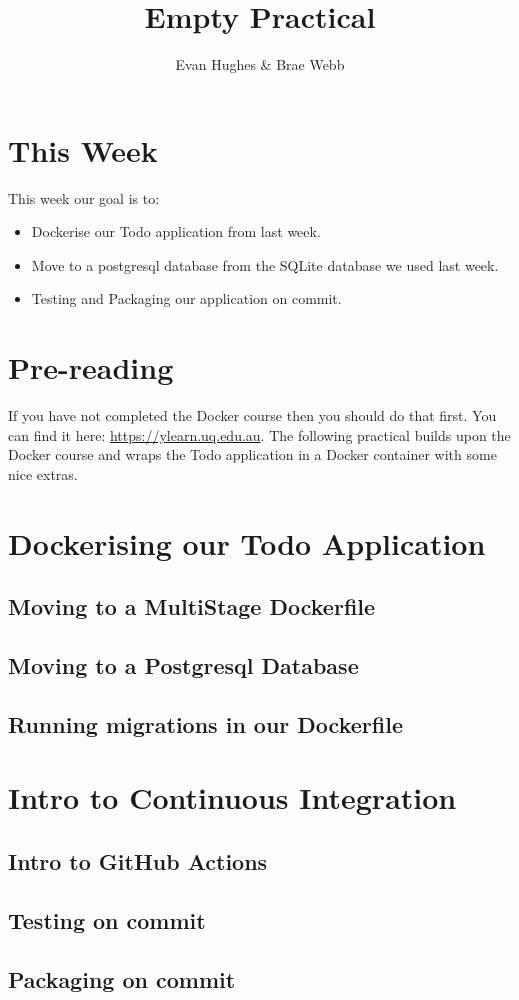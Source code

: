 \documentclass{csse4400}
\title{Empty Practical}
\author{Evan Hughes \& Brae Webb}
\date{\week{0}}
\begin{document}
\maketitle

\section{This Week}
This week our goal is to:
\begin{itemize}
  \item Dockerise our Todo application from last week.
  \item Move to a postgresql database from the SQLite database we used last week.
  \item Testing and Packaging our application on commit.
\end{itemize}

\section{Pre-reading}
If you have not completed the Docker course then you should do that first. You can find it here: \url{https://ylearn.uq.edu.au}. The following practical builds upon the Docker course and wraps the Todo application in a Docker container with some nice extras.

\section{Dockerising our Todo Application}

\subsection{Moving to a MultiStage Dockerfile}

\subsection{Moving to a Postgresql Database}

\subsection{Running migrations in our Dockerfile}

\section{Intro to Continuous Integration}

\subsection{Intro to GitHub Actions}

\subsection{Testing on commit}

\subsection{Packaging on commit}



\end{document}

